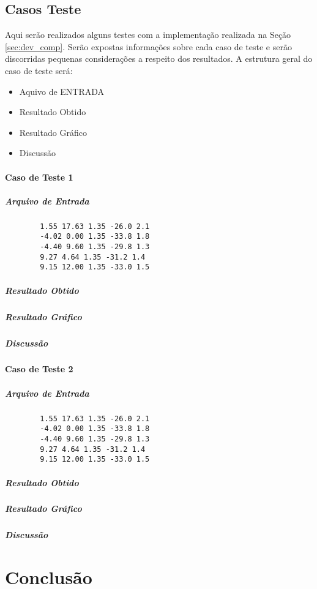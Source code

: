 	\subsection{Casos Teste}
	Aqui serão realizados alguns testes com a implementação realizada na Seção \ref{sec:dev_comp}. Serão expostas informações sobre cada caso de teste
	e serão discorridas pequenas considerações a respeito dos resultados. A estrutura geral do caso de teste será:
	\begin{itemize}
		\item Aquivo de ENTRADA
		\item Resultado Obtido
		\item Resultado Gráfico
		\item Discussão
	\end{itemize}

	\paragraph{Caso de Teste 1}
	\subparagraph{Arquivo de Entrada}
	\begin{verbatim}
		1.55 17.63 1.35 -26.0 2.1
		-4.02 0.00 1.35 -33.8 1.8
		-4.40 9.60 1.35 -29.8 1.3
		9.27 4.64 1.35 -31.2 1.4
		9.15 12.00 1.35 -33.0 1.5
	\end{verbatim}

	\subparagraph{Resultado Obtido}

	\subparagraph{Resultado Gráfico}

	\subparagraph{Discussão}

	\paragraph{Caso de Teste 2}
	\subparagraph{Arquivo de Entrada}
	\begin{verbatim}
		1.55 17.63 1.35 -26.0 2.1
		-4.02 0.00 1.35 -33.8 1.8
		-4.40 9.60 1.35 -29.8 1.3
		9.27 4.64 1.35 -31.2 1.4
		9.15 12.00 1.35 -33.0 1.5
	\end{verbatim}

	\subparagraph{Resultado Obtido}

	\subparagraph{Resultado Gráfico}

	\subparagraph{Discussão}

	\section{Conclusão}
	\label{sec:conclusao}


	
	


